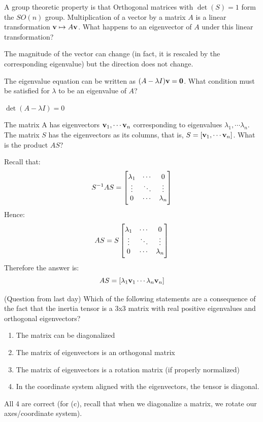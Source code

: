 A group theoretic property is that Orthogonal matrices with $\det(S) = 1$ form the $SO(n)$ group.
\newline Multiplication of a vector by a matrix $A$ is a linear transformation $\mathbf{v} \mapsto A\mathbf{v}$. What happens to an eigenvector of $A$ under this linear transformation?
\begin{s}
The magnitude of the vector can change (in fact, it is rescaled by the corresponding eigenvalue) but the direction does not change.
\end{s}
The eigenvalue equation can be written as $(A - \lambda I)\mathbf{v} = \mathbf{0}$. What condition must be satisfied for $\lambda$ to be an eigenvalue of $A$?
\begin{s}
$\det(A - \lambda I) = 0$
\end{s}
The matrix A has eigenvectors $\mathbf{v}_1, \cdots \mathbf{v}_n$ corresponding to eigenvalues $\lambda_1, \cdots \lambda_n$. The matrix $S$ has the eigenvectors as its columns, that is, $S = [\mathbf{v}_1, \cdots \mathbf{v}_n]$. What is the product $AS$?
\begin{s}
Recall that:
\[S^{-1}AS = \begin{bmatrix}\lambda_1 &  \cdots &  0 \\ \vdots & \ddots & \vdots \\ 0 & \cdots & \lambda_n\end{bmatrix}\]
Hence:
\[AS = S\begin{bmatrix}\lambda_1 &  \cdots &  0 \\ \vdots & \ddots & \vdots \\ 0 & \cdots & \lambda_n\end{bmatrix}\]
Therefore the answer is:
\[AS = [\lambda_1 \mathbf{v}_1 \cdots \lambda_n\mathbf{v}_n]\]
\end{s}
(Question from last day) Which of the following statements are a consequence of the fact that the inertia tensor is a 3x3 matrix with real positive eigenvalues and orthogonal eigenvectors?
\begin{enumerate}
    \item The matrix can be diagonalized
    \item The matrix of eigenvectors is an orthogonal matrix
    \item The matrix of eigenvectors is a rotation matrix (if properly normalized)
    \item In the coordinate system aligned with the eigenvectors, the tensor is diagonal.
\end{enumerate}
\begin{s}
    All 4 are correct (for (c), recall that when we diagonalize a matrix, we rotate our axes/coordinate system). 
\end{s}

